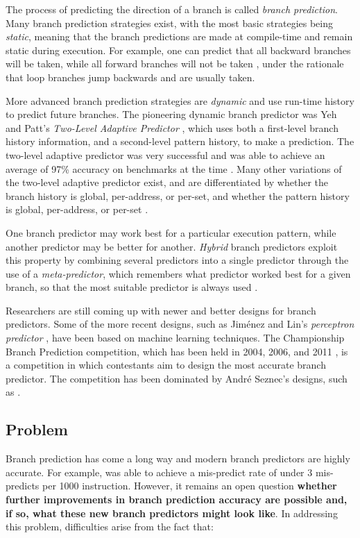 \documentclass[conference]{IEEEtran}
\begin{document}
The process of predicting the direction of a branch is called \emph{branch prediction}. Many branch prediction strategies exist, with the most basic strategies being \emph{static}, meaning that the branch predictions are made at compile-time and remain static during execution. For example, one can predict that all backward branches will be taken, while all forward branches will not be taken \cite{Smith98}, under the rationale that loop branches jump backwards and are usually taken. 

More advanced branch prediction strategies are \emph{dynamic} and use run-time history to predict future branches. The pioneering dynamic branch predictor was Yeh and Patt's \emph{Two-Level Adaptive Predictor} \cite{Patt91}, which uses both a first-level branch history information, and a second-level pattern history, to make a prediction. The two-level adaptive predictor was very successful and was able to achieve an average of 97\% accuracy on benchmarks at the time \cite{Patt91}. Many other variations of the two-level adaptive predictor exist, and are differentiated by whether the branch history is global, per-address, or per-set, and whether the pattern history is global, per-address, or per-set \cite{Patt93}. 

One branch predictor may work best for a particular execution pattern, while another predictor may be better for another. \emph{Hybrid} branch predictors exploit this property by combining several predictors into a single predictor through the use of  a \emph{meta-predictor}, which remembers what predictor worked best for a given branch, so that the most suitable predictor is always used \cite{McFarling93}. 

Researchers are still coming up with newer and better designs for branch predictors. Some of the more recent designs, such as Jim\'{e}nez and Lin's \emph{perceptron predictor} \cite{Lin01}, have been based on machine learning techniques. The Championship Branch Prediction competition, which has been held in 2004, 2006, and 2011 \cite{championship}, is a competition in which contestants aim to design the most accurate branch predictor. The competition has been dominated by Andr\'{e} Seznec's designs, such as \cite{Seznec05}.

 

\subsection{Problem}
\label{sec:problem}
Branch prediction has come a long way and modern branch predictors are highly accurate. For example, \cite{Seznec05} was able to achieve a mis-predict rate of under 3 mis-predicts per 1000 instruction. However, it remains an open question \textbf{whether further improvements in branch prediction accuracy are possible and, if so, what these new branch predictors might look like}.
In addressing this problem, difficulties arise from the fact that:
\end{document}
